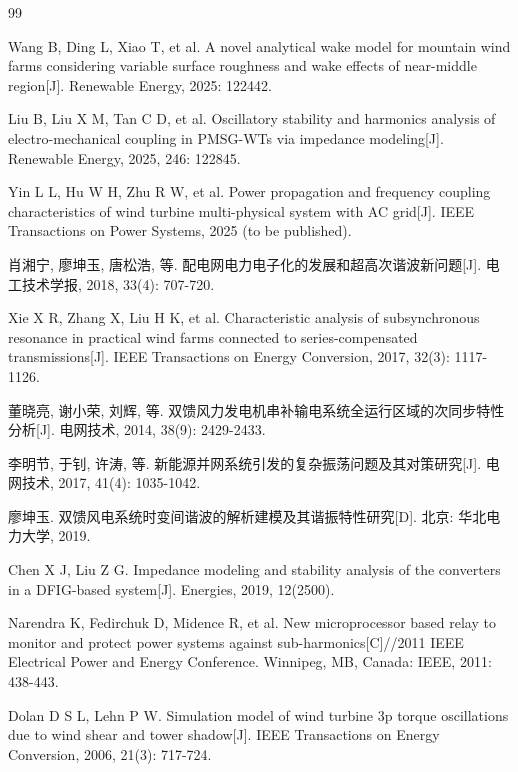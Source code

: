 \documentclass[withoutpreface,bwprint]{cumcmthesis}
\begin{document}
\begin{thebibliography}{99}

Wang B, Ding L, Xiao T, et al. A novel analytical wake model for mountain wind farms considering variable surface roughness and wake effects of near-middle region[J]. Renewable Energy, 2025: 122442.

Liu B, Liu X M, Tan C D, et al. Oscillatory stability and harmonics analysis of electro-mechanical coupling in PMSG-WTs via impedance modeling[J]. Renewable Energy, 2025, 246: 122845.

Yin L L, Hu W H, Zhu R W, et al. Power propagation and frequency coupling characteristics of wind turbine multi-physical system with AC grid[J]. IEEE Transactions on Power Systems, 2025 (to be published).

肖湘宁, 廖坤玉, 唐松浩, 等. 配电网电力电子化的发展和超高次谐波新问题[J]. 电工技术学报, 2018, 33(4): 707-720.

Xie X R, Zhang X, Liu H K, et al. Characteristic analysis of subsynchronous resonance in practical wind farms connected to series-compensated transmissions[J]. IEEE Transactions on Energy Conversion, 2017, 32(3): 1117-1126.

董晓亮, 谢小荣, 刘辉, 等. 双馈风力发电机串补输电系统全运行区域的次同步特性分析[J]. 电网技术, 2014, 38(9): 2429-2433.

李明节, 于钊, 许涛, 等. 新能源并网系统引发的复杂振荡问题及其对策研究[J]. 电网技术, 2017, 41(4): 1035-1042.

廖坤玉. 双馈风电系统时变间谐波的解析建模及其谐振特性研究[D]. 北京: 华北电力大学, 2019.

Chen X J, Liu Z G. Impedance modeling and stability analysis of the converters in a DFIG-based system[J]. Energies, 2019, 12(2500).

Narendra K, Fedirchuk D, Midence R, et al. New microprocessor based relay to monitor and protect power systems against sub-harmonics[C]//2011 IEEE Electrical Power and Energy Conference. Winnipeg, MB, Canada: IEEE, 2011: 438-443.

Dolan D S L, Lehn P W. Simulation model of wind turbine 3p torque oscillations due to wind shear and tower shadow[J]. IEEE Transactions on Energy Conversion, 2006, 21(3): 717-724.


\end{thebibliography}
\end{document}
